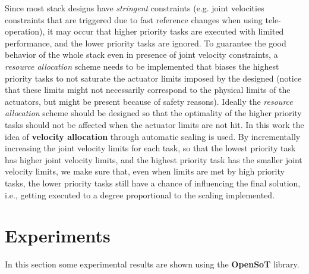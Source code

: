 Since most stack designs have \emph{stringent} constraints (e.g. joint velocities constraints that are triggered due to fast reference changes when using tele-operation), it may occur that higher priority tasks are executed with limited performance, and the lower priority tasks are ignored. To guarantee the good behavior of the whole stack even in presence of joint velocity constraints, a \emph{resource allocation} scheme needs to be implemented that biases the highest priority tasks to not saturate the actuator limits imposed by the designed (notice that these limits might not necessarily correspond to the physical limits of the actuators, but might be present because of safety reasons).
Ideally the \emph{resource allocation} scheme should be designed so that the optimality of the higher priority tasks should not be affected when the actuator limits are not hit.
In this work the idea of \textbf{velocity allocation} through automatic scaling is used. By incrementally increasing the joint velocity limits for each task, so that the lowest priority task has higher joint velocity limits, and the highest priority task has the smaller joint velocity limits, we make sure that, even when limits are met by high priority tasks, the lower priority tasks still have a chance of influencing the final solution, i.e., getting executed to a degree proportional to the scaling implemented.

\section{Experiments}
\label{sec:robot-Cartesian-control:experiments}
In this section some experimental results are shown using the \textbf{OpenSoT} library.  

